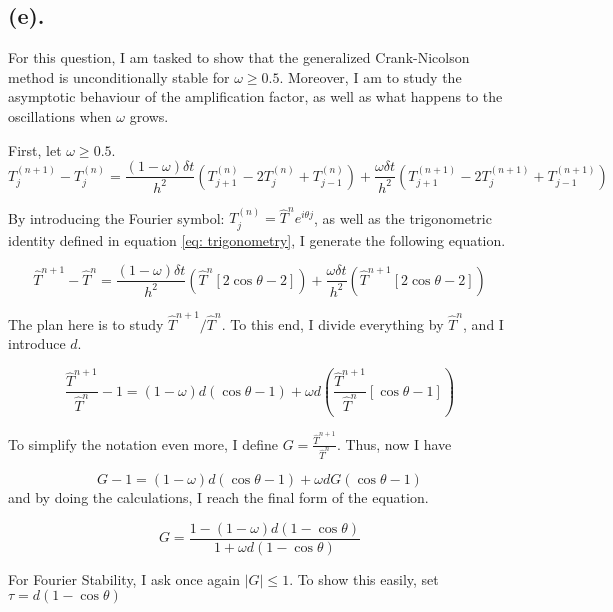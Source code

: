 
\subsection{(e).}
\label{subsec: 4e}

For this question, I am tasked to show that the generalized Crank-Nicolson method is unconditionally stable for \( \omega \geq 0.5 \). Moreover, I am to study the asymptotic behaviour of the amplification factor, as well as what happens to the oscillations when \( \omega \) grows.

First, let \( \omega \geq 0.5 \). 
\[
	T_{j}^{(n+1)} - T_{j}^{(n)} = \frac{(1-\omega)\delta t}{h^2}\left( T_{j+1}^{(n)} - 2T_{j}^{(n)} + T_{j-1}^{(n)} \right) + \frac{\omega \delta t}{h^2} \left( T_{j+1}^{(n+1)} - 2T_{j}^{(n+1)} + T_{j-1}^{(n+1)} \right)
\]

By introducing the Fourier symbol: \( T_{j}^{(n)} = \hat{T}^{n} e^{i \theta j} \), as well as the trigonometric identity defined in equation \ref{eq: trigonometry}, I generate the following equation.

\[
	\hat{T}^{n+1} - \hat{T}^{n} = \frac{(1-\omega)\delta t}{h^2}\left( \hat{T}^{n} \left[2 \cos\theta - 2 \right] \right) + \frac{\omega \delta t}{h^2} \left( \hat{T}^{n+1} \left[2 \cos\theta - 2 \right] \right)
\]

The plan here is to study \( \hat{T}^{n+1} / \hat{T}^{n} \). To this end, I divide everything by \( \hat{T}^n \), and I introduce \( d \).

\[
	\frac{\hat{T}^{n+1}}{\hat{T}^{n}} - 1 = (1-\omega)d(\cos\theta - 1) + \omega d \left( \frac{\hat{T}^{n+1}}{\hat{T}^{n}} [\cos\theta -1] \right)
\]

To simplify the notation even more, I define \( G = \frac{\hat{T}^{n+1}}{\hat{T}^{n}} \). Thus, now I have

\[
	G - 1 = (1-\omega) d (\cos\theta - 1) + \omega d G (\cos\theta -1)
\]
and by doing the calculations, I reach the final form of the equation.

\[
	G = \frac{1 - (1-\omega)d(1-\cos\theta)}{1+\omega d (1-\cos\theta)}
\]

For Fourier Stability, I ask once again \( |G| \leq 1 \). To show this easily, set \(\tau = d(1 - \cos\theta)\)

